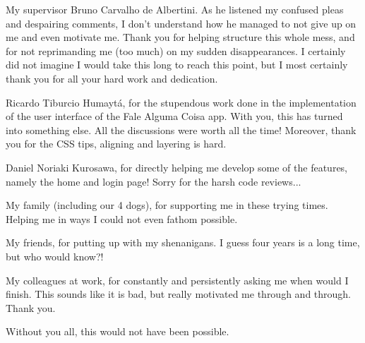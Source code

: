\documentclass[
	12pt,				%
	openright,			%
	oneside,			%
	a4paper,			%
	hyphens,			%
	english,			%
	english				%
]{abntex2}
\begin{document}

	\frenchspacing

	\pretextual

	\imprimircapa

	\imprimirfolhaderosto*
	
    
    
    
    \begin{agradecimentos}
    My supervisor Bruno Carvalho de Albertini. As he listened my confused pleas and despairing comments, I don't understand how he managed to not give up on me and even motivate me. Thank you for helping structure this whole mess, and for not reprimanding me (too much) on my sudden disappearances. I certainly did not imagine I would take this long to reach this point, but I most certainly thank you for all your hard work and dedication.

    Ricardo Tiburcio Humaytá, for the stupendous work done in the implementation of the user interface of the Fale Alguma Coisa app. With you, this has turned into something else. All the discussions were worth all the time! Moreover, thank you for the CSS tips, aligning and layering is hard.
    
    Daniel Noriaki Kurosawa, for directly helping me develop some of the features, namely the home and login page! Sorry for the harsh code reviews...

    My family (including our 4 dogs), for supporting me in these trying times. Helping me in ways I could not even fathom possible.
    
    My friends, for putting up with my shenanigans. I guess four years is a long time, but who would know?!
    
    My colleagues at work, for constantly and persistently asking me when would I finish. This sounds like it is bad, but really motivated me through and through. Thank you.

    Without you all, this would not have been possible.
    \end{agradecimentos}
    
\end{document}
